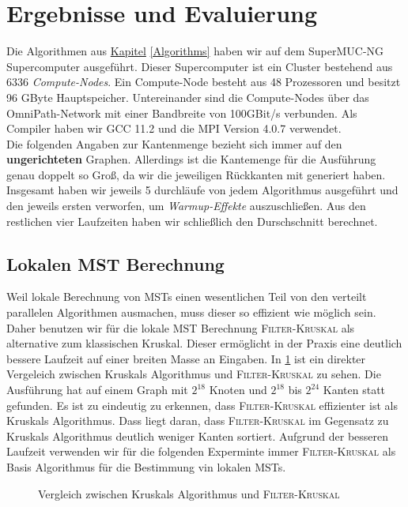 \section{Ergebnisse und Evaluierung}\label{Evaluierung}
Die Algorithmen aus \hyperref[Algorithms]{Kapitel} \ref{Algorithms} haben wir auf dem SuperMUC-NG Supercomputer ausgeführt. Dieser Supercomputer ist ein Cluster bestehend aus 6336 \emph{Compute-Nodes}. Ein Compute-Node besteht aus 48 Prozessoren und besitzt 96 GByte Hauptspeicher. Untereinander sind die Compute-Nodes über das OmniPath-Network mit einer Bandbreite von 100GBit/s verbunden. Als Compiler haben wir GCC 11.2 und die MPI Version 4.0.7 verwendet.\\
 Die folgenden Angaben zur Kantenmenge bezieht sich immer auf den \textbf{ungerichteten} Graphen. Allerdings ist die Kantemenge für die Ausführung genau doppelt so Groß, da wir die jeweiligen Rückkanten mit generiert haben. Insgesamt haben wir jeweils 5 durchläufe von jedem Algorithmus ausgeführt und den jeweils ersten verworfen, um \emph{Warmup-Effekte} auszuschließen. Aus den restlichen vier Laufzeiten haben wir schließlich den Durschschnitt berechnet.

\subsection{Lokalen MST Berechnung}
Weil lokale Berechnung von MSTs einen wesentlichen Teil von den verteilt parallelen Algorithmen ausmachen, muss dieser so effizient wie möglich sein. 
Daher benutzen wir für die lokale MST Berechnung 
\textsc{Filter-Kruskal} als alternative zum klassischen Kruskal. Dieser ermöglicht in der Praxis eine deutlich bessere Laufzeit auf einer breiten Masse an Eingaben. 
In \cref{Filter-Kruskal-Img} ist ein direkter Vergeleich zwischen Kruskals Algorithmus und \textsc{Filter-Kruskal} zu sehen. Die Ausführung hat auf einem Graph mit $2^{18}$ Knoten und $2^{18}$ bis $2^{24}$ Kanten statt gefunden.
Es ist zu eindeutig zu erkennen, dass \textsc{Filter-Kruskal} effizienter ist als Kruskals Algorithmus. Dass liegt daran, dass \textsc{Filter-Kruskal} im Gegensatz zu Kruskals Algorithmus deutlich weniger Kanten sortiert.
Aufgrund der besseren Laufzeit verwenden wir für die folgenden Experminte immer \textsc{Filter-Kruskal} als Basis Algorithmus für die Bestimmung vin lokalen MSTs.

\begin{figure}[H]
    \centering
    
    \caption{Vergleich zwischen Kruskals Algorithmus und \textsc{Filter-Kruskal}}
    \label{Filter-Kruskal-Img}
\end{figure}



